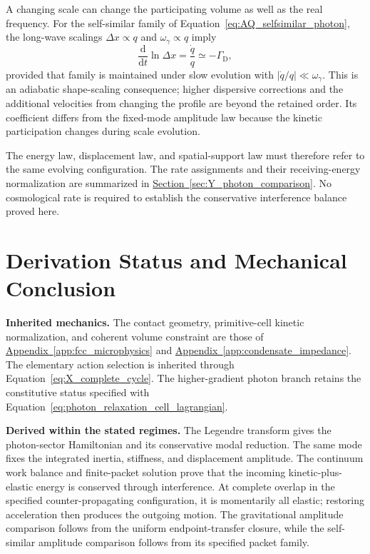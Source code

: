 A changing scale can change the participating volume as well as the real frequency. For the self-similar family of Equation~\eqref{eq:AQ_selfsimilar_photon}, the long-wave scalings $\Delta x\propto q$ and $\omega_\gamma\propto q$ imply
\begin{equation}
    \frac{\mathrm d}{\mathrm dt}\ln\Delta x
    =\frac{\dot q}{q}
    \simeq-\Gamma_{\mathrm D},
\end{equation}
provided that family is maintained under slow evolution with $|\dot q/q|\ll\omega_\gamma$. This is an adiabatic shape-scaling consequence; higher dispersive corrections and the additional velocities from changing the profile are beyond the retained order. Its coefficient differs from the fixed-mode amplitude law because the kinetic participation changes during scale evolution.

The energy law, displacement law, and spatial-support law must therefore refer to the same evolving configuration. The rate assignments and their receiving-energy normalization are summarized in \hyperref[sec:Y_photon_comparison]{Section~\ref*{sec:Y_photon_comparison}}. No cosmological rate is required to establish the conservative interference balance proved here.

\section{Derivation Status and Mechanical Conclusion}

\noindent\textbf{Inherited mechanics.}
The contact geometry, primitive-cell kinetic normalization, and coherent volume constraint are those of \hyperref[app:fcc_microphysics]{Appendix~\ref*{app:fcc_microphysics}} and \hyperref[app:condensate_impedance]{Appendix~\ref*{app:condensate_impedance}}. The elementary action selection is inherited through Equation~\eqref{eq:X_complete_cycle}. The higher-gradient photon branch retains the constitutive status specified with Equation~\eqref{eq:photon_relaxation_cell_lagrangian}.

\medskip
\noindent\textbf{Derived within the stated regimes.}
The Legendre transform gives the photon-sector Hamiltonian and its conservative modal reduction. The same mode fixes the integrated inertia, stiffness, and displacement amplitude. The continuum work balance and finite-packet solution prove that the incoming kinetic-plus-elastic energy is conserved through interference. At complete overlap in the specified counter-propagating configuration, it is momentarily all elastic; restoring acceleration then produces the outgoing motion. The gravitational amplitude comparison follows from the uniform endpoint-transfer closure, while the self-similar amplitude comparison follows from its specified packet family.

